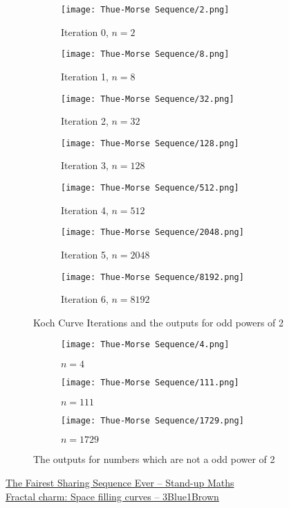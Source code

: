 \begin{figure}[H]
	\centering
	\begin{subfigure}{0.3\linewidth}
		\texttt{[image: Thue-Morse Sequence/2.png]}
		\caption{Iteration 0, $n=2$}
	\end{subfigure}
	\begin{subfigure}{0.3\linewidth}
		\texttt{[image: Thue-Morse Sequence/8.png]}
		\caption{Iteration 1, $n=8$}
	\end{subfigure}
	\begin{subfigure}{0.3\linewidth}
		\texttt{[image: Thue-Morse Sequence/32.png]}
		\caption{Iteration 2, $n=32$}
	\end{subfigure}
	\begin{subfigure}{0.3\linewidth}
		\texttt{[image: Thue-Morse Sequence/128.png]}
		\caption{Iteration 3, $n=128$}
	\end{subfigure}
	\begin{subfigure}{0.3\linewidth}
		\texttt{[image: Thue-Morse Sequence/512.png]}
		\caption{Iteration 4, $n=512$}
	\end{subfigure}
	\begin{subfigure}{0.3\linewidth}
		\texttt{[image: Thue-Morse Sequence/2048.png]}
		\caption{Iteration 5, $n=2048$}
	\end{subfigure}
	\begin{subfigure}{0.3\linewidth}
		\texttt{[image: Thue-Morse Sequence/8192.png]}
		\caption{Iteration 6, $n=8192$}
	\end{subfigure}
	\caption{Koch Curve Iterations and the outputs for odd powers of 2}
\end{figure}
\begin{figure}[H]
	\centering
	\begin{subfigure}{0.3\linewidth}
		\texttt{[image: Thue-Morse Sequence/4.png]}
		\caption{$n=4$}
	\end{subfigure}
	\begin{subfigure}{0.3\linewidth}
		\texttt{[image: Thue-Morse Sequence/111.png]}
		\caption{$n=111$}
	\end{subfigure}
	\begin{subfigure}{0.3\linewidth}
		\texttt{[image: Thue-Morse Sequence/1729.png]}
		\caption{$n=1729$}
	\end{subfigure}
	\caption{The outputs for numbers which are not a odd power of 2}
\end{figure}
\begin{funvideo}
	\href{https://youtu.be/prh72BLNjIk}{The Fairest Sharing Sequence Ever -- Stand-up Maths}\\
	\href{https://youtu.be/RU0wScIj36o}{Fractal charm: Space filling curves -- 3Blue1Brown}
\end{funvideo}
\recalctypearea